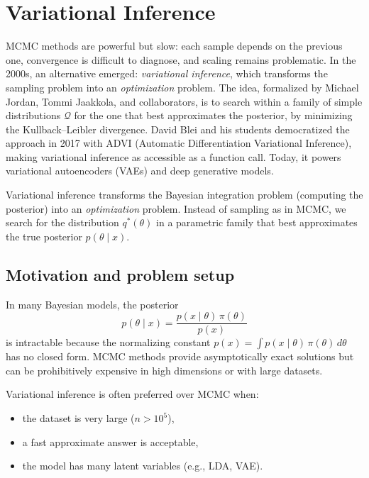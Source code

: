 \chapter{Variational Inference}
\label{ch:variational}

MCMC methods are powerful but slow: each sample depends on the previous one, convergence is difficult to diagnose, and scaling remains problematic. In the 2000s, an alternative emerged: \emph{variational inference}, which transforms the sampling problem into an \emph{optimization} problem. The idea, formalized by Michael Jordan, Tommi Jaakkola, and collaborators, is to search within a family of simple distributions $\mathcal{Q}$ for the one that best approximates the posterior, by minimizing the Kullback--Leibler divergence. David Blei and his students democratized the approach in 2017 with ADVI (Automatic Differentiation Variational Inference), making variational inference as accessible as a function call. Today, it powers variational autoencoders (VAEs) and deep generative models.

\begin{intuition}[title=\textbf{Central idea}]
Variational inference transforms the Bayesian integration problem
(computing the posterior) into an \emph{optimization} problem. Instead of
sampling as in MCMC, we search for the distribution $q^*(\theta)$ in a
parametric family that best approximates the true posterior $p(\theta \mid x)$.
\end{intuition}

\section{Motivation and problem setup}

In many Bayesian models, the posterior
\[
  p(\theta \mid x) = \frac{p(x \mid \theta)\,\pi(\theta)}{p(x)}
\]
is intractable because the normalizing constant
$p(x) = \int p(x \mid \theta)\,\pi(\theta)\,d\theta$ has no closed form.
MCMC methods provide asymptotically exact solutions but can be prohibitively
expensive in high dimensions or with large datasets.

\begin{remark}
Variational inference is often preferred over MCMC when:
\begin{itemize}
  \item the dataset is very large ($n > 10^5$),
  \item a fast approximate answer is acceptable,
  \item the model has many latent variables (e.g., LDA, VAE).
\end{itemize}
\end{remark}


